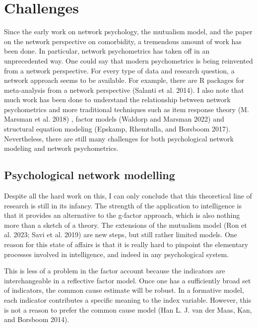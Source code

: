 \documentclass[
  letterpaper,
]{scrbook}
\begin{document}
\hypertarget{challenges}{%
\section{Challenges}\label{challenges}}

Since the early work on network psychology, the mutualism model, and the
paper on the network perspective on comorbidity, a tremendous amount of
work has been done. In particular, network psychometrics has taken off
in an unprecedented way. One could say that modern psychometrics is
being reinvented from a network perspective. For every type of data and
research question, a network approach seems to be available. For
example, there are R packages for meta-analysis from a network
perspective (Salanti et al. 2014). I also note that much work has been
done to understand the relationship between network psychometrics and
more traditional techniques such as item response theory (M. Marsman et
al. 2018) , factor models (Waldorp and Marsman 2022) and structural
equation modeling (Epskamp, Rhemtulla, and Borsboom 2017). Nevertheless,
there are still many challenges for both psychological network modeling
and network psychometrics.

\hypertarget{psychological-network-modelling}{%
\subsection{Psychological network
modelling}\label{psychological-network-modelling}}

Despite all the hard work on this, I can only conclude that this
theoretical line of research is still in its infancy. The strength of
the application to intelligence is that it provides an alternative to
the g-factor approach, which is also nothing more than a sketch of a
theory. The extensions of the mutualism model (Ron et al. 2023; Savi et
al. 2019) are new steps, but still rather limited models. One reason for
this state of affairs is that it is really hard to pinpoint the
elementary processes involved in intelligence, and indeed in any
psychological system.

This is less of a problem in the factor account because the indicators
are interchangeable in a reflective factor model. Once one has a
sufficiently broad set of indicators, the common cause estimate will be
robust. In a formative model, each indicator contributes a specific
meaning to the index variable. However, this is not a reason to prefer
the common cause model (Han L. J. van der Maas, Kan, and Borsboom 2014).
\end{document}
